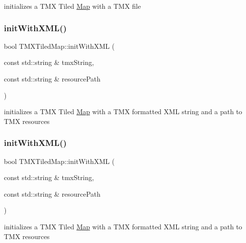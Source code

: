 initializes a T\+MX Tiled \hyperlink{classMap}{Map} with a T\+MX file \mbox{\label{classTMXTiledMap_a949cfae17a8c6239e4d433dcae521997}} 
\subsubsection{\texorpdfstring{init\+With\+X\+M\+L()}{initWithXML()}\hspace{0.1cm}{\footnotesize\ttfamily [1/2]}}
{\footnotesize\ttfamily bool T\+M\+X\+Tiled\+Map\+::init\+With\+X\+ML (\begin{DoxyParamCaption}\item[{const std\+::string \&}]{tmx\+String,  }\item[{const std\+::string \&}]{resource\+Path }\end{DoxyParamCaption})}

initializes a T\+MX Tiled \hyperlink{classMap}{Map} with a T\+MX formatted X\+ML string and a path to T\+MX resources \mbox{\label{classTMXTiledMap_a949cfae17a8c6239e4d433dcae521997}} 
\subsubsection{\texorpdfstring{init\+With\+X\+M\+L()}{initWithXML()}\hspace{0.1cm}{\footnotesize\ttfamily [2/2]}}
{\footnotesize\ttfamily bool T\+M\+X\+Tiled\+Map\+::init\+With\+X\+ML (\begin{DoxyParamCaption}\item[{const std\+::string \&}]{tmx\+String,  }\item[{const std\+::string \&}]{resource\+Path }\end{DoxyParamCaption})}

initializes a T\+MX Tiled \hyperlink{classMap}{Map} with a T\+MX formatted X\+ML string and a path to T\+MX resources \mbox{\label{classTMXTiledMap_a31f870242ee4c67f871f177d4ac74682}} 

